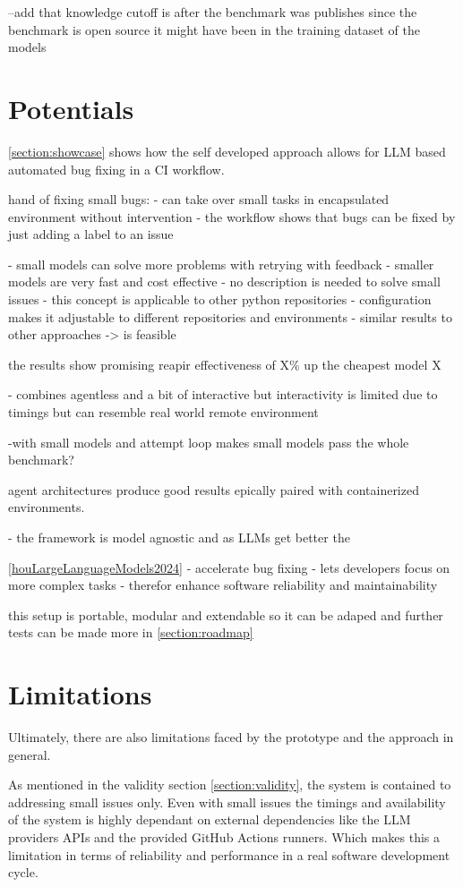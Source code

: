 --add that knowledge cutoff is after the benchmark was publishes since the benchmark is open source it might have been in the training dataset of the models

\section{Potentials}

\ref{section:showcase} shows how the self developed approach allows for LLM based automated bug fixing in a CI workflow. 

hand of fixing small bugs:
- can take over small tasks in encapsulated environment without intervention
- the workflow shows that bugs can be fixed by just adding a label to an issue

- small models can solve more problems with retrying with feedback
- smaller models are very fast and cost effective
- no description is needed to solve small issues
- this concept is applicable to other python repositories
- configuration makes it adjustable to different repositories and environments
- similar results to other approaches -> is feasible

the results show promising reapir effectiveness of X\% up the cheapest model X

- combines agentless and a bit of interactive but interactivity is limited due to timings but can resemble real world remote environment

-with small models and attempt loop makes small models pass the whole benchmark?

agent architectures produce good results epically paired with containerized environments. \cite{puvvadiCodingAgentsComprehensive2025}

- the framework is model agnostic and as LLMs get better the

\ref{houLargeLanguageModels2024}
- accelerate bug fixing
- lets developers focus on more complex tasks
- therefor enhance software reliability and maintainability


this setup is portable, modular and extendable so it can be adaped and further tests can be made more in \ref{section:roadmap}

\section{Limitations}
Ultimately, there are also limitations faced by the prototype and the approach in general.

As mentioned in the validity section \ref{section:validity}, the system is contained to addressing small issues only. Even with small issues the timings and availability of the system is highly dependant on external dependencies like the LLM providers APIs and the provided GitHub Actions runners. Which makes this a limitation in terms of reliability and performance in a real software development cycle.

